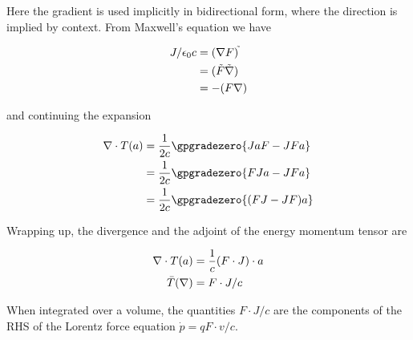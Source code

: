 \documentclass[]{eliblog}
\begin{document}
Here the gradient is used implicitly in bidirectional form, where the direction is implied by context.
From Maxwell's equation we have

\begin{align*}
J/\epsilon_0 c
&= (\nabla F)^{\tilde{}} \\
&= (\tilde{F} \tilde{\nabla}) \\
&= -(F \nabla)
\end{align*}

and continuing the expansion

\begin{align*}
\grad \cdot T(a)
&= \frac{1}{2c} \gpgradezero{ J a F - J F a } \\
&= \frac{1}{2c} \gpgradezero{ F J a - J F a } \\
&= \frac{1}{2c} \gpgradezero{ (F J - J F) a } \\
\end{align*}

Wrapping up, the divergence and the adjoint of the energy momentum tensor are

\begin{align}
\nabla \cdot T(a) &= \frac{1}{c} (F \cdot J) \cdot a \\
\bar{T}(\nabla) &= F \cdot J/c
\end{align}

When integrated over a volume, the quantities $F \cdot J/c$ are the components of the RHS of the Lorentz
force equation $\dot{p} = q F \cdot v/c$.



\end{document}
